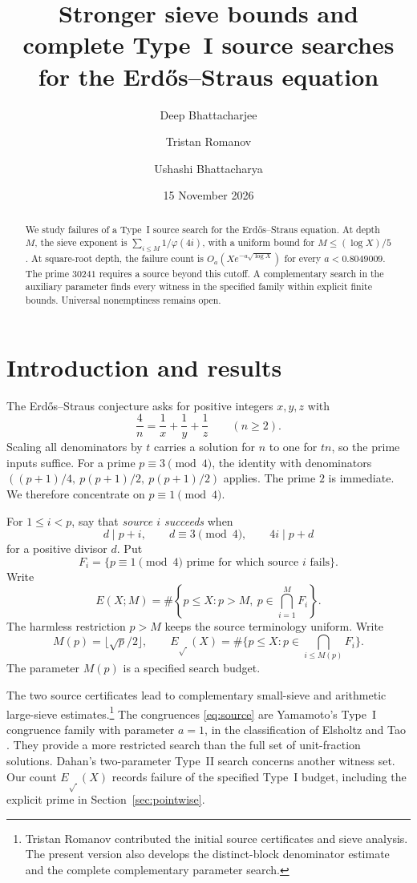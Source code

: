 \documentclass[11pt,a4paper]{amsart}
\title[Type I source searches for the Erd\H{o}s--Straus equation]{Stronger sieve bounds and complete Type~I source searches for the Erd\H{o}s--Straus equation}
\author[D. Bhattacharjee]{Deep Bhattacharjee}
\author[T. Romanov]{Tristan Romanov}
\author[U. Bhattacharya]{Ushashi Bhattacharya}
\date{15 November 2026}
\theoremstyle{definition}\newtheorem{definition}[theorem]{Definition}
\begin{document}
\begin{abstract}
We study failures of a Type~I source search for the Erd\H{o}s--Straus
equation. At depth $M$, the sieve exponent is
$\sum_{i\le M}1/\varphi(4i)$, with a uniform bound for
$M\le(\log X)/5$. At square-root depth, the failure count is
$O_a(Xe^{-a\sqrt{\log X}})$ for every $a<0.8049009$.
The prime $30241$ requires a source beyond this cutoff.
A complementary search in the auxiliary parameter finds every
witness in the specified family within explicit finite bounds.
Universal nonemptiness remains open.
\end{abstract}
\maketitle

\section{Introduction and results}
The Erd\H{o}s--Straus conjecture asks for positive integers $x,y,z$ with
\begin{equation}\label{eq:es}
 \frac4n=\frac1x+\frac1y+\frac1z
 \qquad(n\ge2).
\end{equation}
Scaling all denominators by $t$ carries a solution for $n$ to one for
$tn$, so the prime inputs suffice. For a prime $p\equiv3\pmod4$,
the identity with denominators
$((p+1)/4,\ p(p+1)/2,\ p(p+1)/2)$ applies.
The prime $2$ is immediate. We therefore concentrate on
$p\equiv1\pmod4$.

For $1\le i<p$, say that \emph{source $i$ succeeds} when
\begin{equation}\label{eq:source}
 d\mid p+i,\qquad d\equiv3\pmod4,\qquad 4i\mid p+d
\end{equation}
for a positive divisor $d$. Put
\[
 F_i=\{p\equiv1\pmod4\text{ prime for which source }i\text{ fails}\}.
\]
Write
\[
 E(X;M)=\#\left\{p\le X:p>M,\
                         p\in\bigcap_{i=1}^M F_i\right\}.
\]
The harmless restriction $p>M$ keeps the source terminology uniform.
Write
\[
 M(p)=\lfloor\sqrt p/2\rfloor,\qquad
 E_{\sqrt{\ }}(X)=\#\{p\le X:p\in\bigcap_{i\le M(p)}F_i\}.
\]
The parameter $M(p)$ is a specified search budget.

The two source certificates lead to complementary small-sieve and
arithmetic large-sieve estimates.\footnote{Tristan Romanov contributed
the initial source certificates and sieve analysis. The present
version also develops the distinct-block denominator estimate and
the complete complementary parameter search.}
The congruences \eqref{eq:source} are
Yamamoto's Type~I congruence family with parameter $a=1$, in the
classification of Elsholtz and Tao \cite[Proposition~1.9]{ET}.
They provide a more restricted search than the full set of
unit-fraction solutions. Dahan's two-parameter Type~II search \cite{Dahan} concerns another
witness set. Our count $E_{\sqrt{\ }}(X)$ records failure of the specified Type~I
budget, including the explicit prime in Section~\ref{sec:pointwise}.
\end{document}
